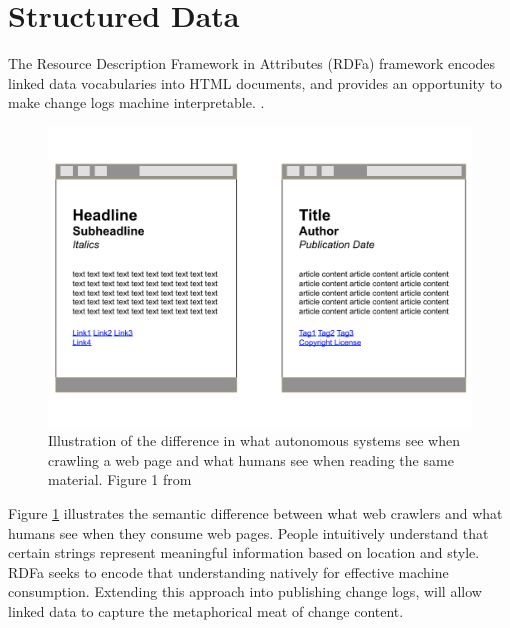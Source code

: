 \section{Structured Data}

The Resource Description Framework in Attributes (RDFa) framework encodes linked data vocabularies into HTML documents, and provides an opportunity to make change logs machine interpretable. \cite{Adida2015}.
\begin{figure}
	\centering
	\includegraphics[scale=0.40]{figures/RDFaSemantics.png}
	\caption[Illustration of the difference in what autonomous systems see when crawling a web page and what humans see when reading the same material.]{Illustration of the difference in what autonomous systems see when crawling a web page and what humans see when reading the same material. Figure 1 from \cite{Herman2015}}
	\label{RDFa}
\end{figure}Figure \ref{RDFa} illustrates the semantic difference between what web crawlers and what humans see when they consume web pages.
People intuitively understand that certain strings represent meaningful information based on location and style.
RDFa seeks to encode that understanding natively for effective machine consumption.
Extending this approach into publishing change logs, will allow linked data to capture the metaphorical meat of change content.


